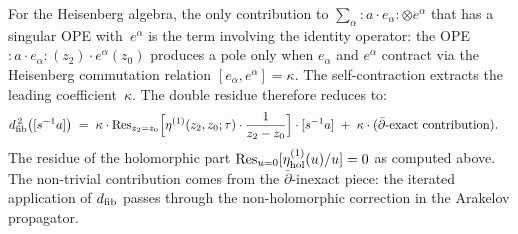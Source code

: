 \begin{computation}
For the Heisenberg algebra, the only contribution to
$\sum_\alpha {:}a \cdot e_\alpha{:} \otimes e^\alpha$ that has a
singular OPE with~$e^\alpha$ is the term involving the identity
operator: the OPE ${:}a \cdot e_\alpha{:}(z_2) \cdot e^\alpha(z_0)$
produces a pole only when $e_\alpha$ and $e^\alpha$ contract via the
Heisenberg commutation relation $[e_\alpha, e^\alpha] = \kappa$.
The self-contraction extracts the leading coefficient~$\kappa$.
The double residue therefore reduces to:
\begin{align}\label{eq:dfib-sq-reduces}
 d_{\mathrm{fib}}^{\,2}\bigl([s^{-1}a]\bigr)
 &\;=\;
 \kappa \cdot
 \operatorname{Res}_{z_2=z_0}\Bigl[
 \eta^{(1)}(z_2,z_0;\tau) \cdot \frac{1}{z_2-z_0}
 \Bigr]
 \cdot [s^{-1}a]
 \;+\;
 \kappa \cdot (\text{$\bar\partial$-exact contribution}).
\end{align}
The residue of the holomorphic part
$\operatorname{Res}_{u=0}[\eta^{(1)}_{\mathrm{hol}}(u)/u] = 0$ as computed above.
The non-trivial contribution comes from the $\bar\partial$-inexact
piece: the iterated application of $d_{\mathrm{fib}}$ passes through the
non-holomorphic correction in the Arakelov propagator.


\end{computation}
